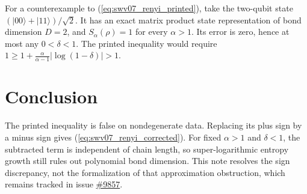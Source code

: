 \documentclass{article}
\begin{document}
For a counterexample to (\ref{eq:swv07_renyi_printed}), take the two-qubit
state $(|00\rangle+|11\rangle)/\sqrt2$. It has an exact matrix product state
representation of bond dimension $D=2$, and $S_\alpha(\rho)=1$ for every
$\alpha>1$. Its error is zero, hence at most any $0<\delta<1$.
The printed inequality would require
$1\ge1+\frac{\alpha}{\alpha-1}|\log(1-\delta)|>1$.

\section{Conclusion}

The printed inequality is false on nondegenerate data. Replacing its plus
sign by a minus sign gives (\ref{eq:swv07_renyi_corrected}). For fixed
$\alpha>1$ and $\delta<1$, the subtracted term is independent of chain
length, so super-logarithmic entropy growth still rules out polynomial bond
dimension. This note resolves the sign discrepancy, not the formalization
of that approximation obstruction, which remains tracked in issue
\href{https://github.com/LionSR/TNLean/issues/9857}{\#9857}.



\end{document}

